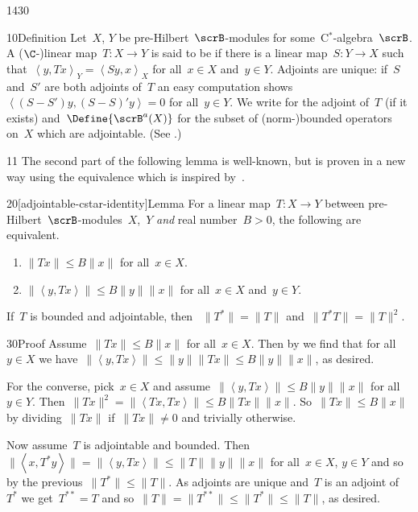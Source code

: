 \begin{parsec}{1430}%
\begin{point}{10}{Definition}%
Let~$X$, $Y$ be pre-Hilbert~$\scrB$-modules
    for some~C$^*$-algebra~$\scrB$.
    A ($\C$-)linear map~$T\colon X \to Y$
    is said to be 
    if there is a linear map~$S \colon Y \to X$
    such that~$\left<y, Tx\right>_Y = \left<Sy, x\right>_X$
    for all~$x \in X$ and~$y \in Y$.
Adjoints are unique:
    if~$S$ and~$S'$ are both adjoints of~$T$
    an easy computation shows~$\left<(S-S')y,(S-S)'y\right>=0$
    for all~$y \in Y$.
We write  for the adjoint of~$T$ (if it exists)
and~$\Define{\scrB^a(X)}$
    for the subset of (norm-)bounded operators on~$X$
    which are adjointable. (See \cite[\S2]{paschke}.)
\end{point}
\begin{point}{11}%
The second part of the following lemma is well-known,
    but is proven in a new way using
    the equivalence which is inspired
    by~\cite[thm.~2.8 (ii)]{paschke}.
\end{point}
\begin{point}{20}[adjointable-cstar-identity]{Lemma}%
For a linear map~$T \colon X \to Y$
between pre-Hilbert~$\scrB$-modules~$X$,~$Y$ \emph{and}
real number~$B > 0$,
the following are equivalent.
\begin{enumerate}
    \item $\|T x\| \leq B \|x\|$ for all~$x \in X$.
    \item $\|\left<y,Tx\right>\| \leq B \|y\|\|x\|$
            for all~$x \in X$ and~$y \in Y$.
\end{enumerate}
If~$T$ is bounded and adjointable, then 
    ~$\|T^*\| = \|T\|$ and~$\|T^*T\|=\|T\|^2$.
\begin{point}{30}{Proof}%
   Assume~$\|Tx\| \leq B \|x\|$ for all~$x \in X$.
   Then by 
   we find that for all~$y \in X$ we have~$\|\left<y, Tx\right>\|
            \leq \|y\|\|Tx\|
            \leq B \|y\|\|x\|$, as desired.

For the converse, pick~$x\in X$
    and assume~$\|\left<y,Tx\right>\| \leq B \|y\|\|x\|$
            for all~$y \in Y$.
Then~$\|Tx \|^2 = \|\left<Tx,Tx\right>\|
                \leq B\|Tx\|\|x\|$.
So~$\|Tx\| \leq B\|x\|$
    by dividing~$\|Tx\|$ if~$\|Tx\|\neq0$
    and trivially otherwise.

Now assume~$T$ is adjointable and bounded.
Then~$\|\left<x,T^*y\right>\| = \|\left<y, Tx\right>\| \leq \|T\|\|y\|\|x\|$
    for all~$x \in X$, $y\in Y$
    and so by the previous~$\| T^*\| \leq \|T\|$.
As adjoints are unique and~$T$ is an adjoint of~$T^*$
    we get~$T^{**}=T$
    and so~$\|T\| = \|T^{**}\| \leq \|T^*\| \leq \|T\|$, as desired.


\end{point}
\end{point}
\end{parsec}

